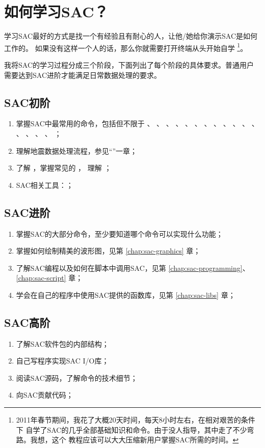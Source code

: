 \section{如何学习SAC？}
学习SAC最好的方式是找一个有经验且有耐心的人，让他/她给你演示SAC是如何工作的。
如果没有这样一个人的话，那么你就需要打开终端从头开始自学
\footnote{2011年春节期间，我花了大概20天时间，每天8小时左右，在相对艰苦的条件下
    自学了SAC的几乎全部基础知识和命令。由于没人指导，其中走了不少弯路。我想，这个
    教程应该可以大大压缩新用户掌握SAC所需的时间。}。

我将SAC的学习过程分成三个阶段，下面列出了每个阶段的具体要求。普通用户
需要达到SAC进阶才能满足日常数据处理的要求。

\subsection*{SAC初阶}
\begin{enumerate}
    \item 掌握SAC中最常用的命令，包括但不限于
            、
            、
            、
            、
            、
            、
            、
            、
            、
            、
            、
            、
            、
            、
            、
            、
            ；
        \item 理解地震数据处理流程，参见``''一章；
        \item 了解 ，掌握常见的 ，
            理解 ；
        \item SAC相关工具：；
\end{enumerate}

\subsection*{SAC进阶}
\begin{enumerate}
\item 掌握SAC的大部分命令，至少要知道哪个命令可以实现什么功能；
\item 掌握如何绘制精美的波形图，见第 \ref{chap:sac-graphics} 章；
\item 了解SAC编程以及如何在脚本中调用SAC，见第 \ref{chap:sac-programming}、\ref{chap:sac-script} 章；
\item 学会在自己的程序中使用SAC提供的函数库，见第 \ref{chap:sac-libs} 章；
\end{enumerate}

\subsection*{SAC高阶}
\begin{enumerate}
\item 了解SAC软件包的内部结构；
\item 自己写程序实现SAC I/O库；
\item 阅读SAC源码，了解命令的技术细节；
\item 向SAC贡献代码；
\end{enumerate}
